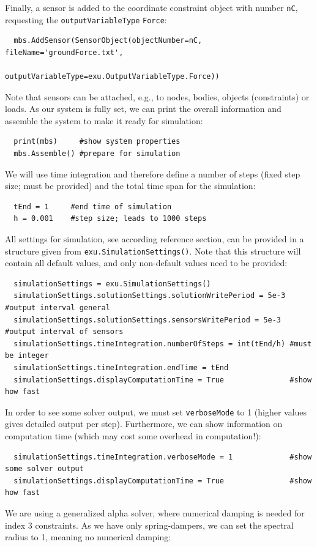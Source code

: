 Finally, a sensor is added to the coordinate constraint object with number \texttt{nC}, requesting the \texttt{outputVariableType} \texttt{Force}:
\pythonstyle\begin{lstlisting}
  mbs.AddSensor(SensorObject(objectNumber=nC, fileName='groundForce.txt', 
                             outputVariableType=exu.OutputVariableType.Force))
\end{lstlisting}
Note that sensors can be attached, e.g., to nodes, bodies, objects (constraints) or loads.
%
As our system is fully set, we can print the overall information and assemble the system to make it ready for simulation:
\pythonstyle\begin{lstlisting}
  print(mbs)     #show system properties
  mbs.Assemble() #prepare for simulation
\end{lstlisting}
%
We will use time integration and therefore define a number of steps (fixed step size; must be provided) and the total time span for the simulation:
\pythonstyle\begin{lstlisting}
  tEnd = 1     #end time of simulation
  h = 0.001    #step size; leads to 1000 steps
\end{lstlisting}
%
All settings for simulation, see according reference section, can be provided in a structure given from \texttt{exu.SimulationSettings()}. Note that this structure will contain all default values, and only non-default values need to be provided:
\pythonstyle\begin{lstlisting}
  simulationSettings = exu.SimulationSettings()
  simulationSettings.solutionSettings.solutionWritePeriod = 5e-3 #output interval general
  simulationSettings.solutionSettings.sensorsWritePeriod = 5e-3  #output interval of sensors
  simulationSettings.timeIntegration.numberOfSteps = int(tEnd/h) #must be integer
  simulationSettings.timeIntegration.endTime = tEnd
  simulationSettings.displayComputationTime = True               #show how fast
\end{lstlisting}
%
In order to see some solver output, we must set \texttt{verboseMode} to 1 (higher values gives detailed output per step).
Furthermore, we can show information on computation time (which may cost some overhead in computation!):
\pythonstyle\begin{lstlisting}
  simulationSettings.timeIntegration.verboseMode = 1             #show some solver output
  simulationSettings.displayComputationTime = True               #show how fast
\end{lstlisting}
We are using a generalized alpha solver, where numerical damping is needed for index 3 constraints. As we have only spring-dampers, we can set the spectral radius to 1, meaning no numerical damping:
